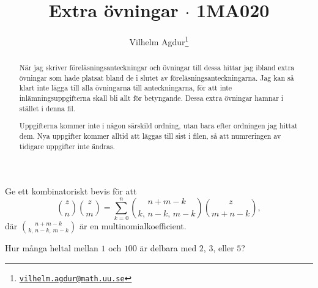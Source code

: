\documentclass[nobib]{tufte-handout}
\title{Extra övningar $\cdot$ 1MA020}
\author[Vilhelm Agdur]{Vilhelm Agdur\thanks{\href{mailto:vilhelm.agdur@math.uu.se}{\nolinkurl{vilhelm.agdur@math.uu.se}}}}
\begin{document}

\maketitle%

\begin{abstract}
\noindent
När jag skriver föreläsningsanteckningar och övningar till dessa hittar jag ibland extra övningar som hade platsat bland de i slutet av föreläsningsanteckningarna. Jag kan så klart inte lägga till alla övningarna till anteckningarna, för att inte inlämningsuppgifterna skall bli allt för betyngande. Dessa extra övningar hamnar i stället i denna fil.

Uppgifterna kommer inte i någon särskild ordning, utan bara efter ordningen jag hittat dem. Nya uppgifter kommer alltid att läggas till sist i filen, så att numreringen av tidigare uppgifter inte ändras.
\end{abstract}

\begin{xca}
    Ge ett kombinatoriskt bevis för att
    $$\binom{z}{n}\binom{z}{m} = \sum_{k=0}^{n} \binom{n + m - k}{k,\,n-k,\,m-k}\binom{z}{m + n -k},$$
    där $\binom{n + m - k}{k,\,n-k,\,m-k}$ är en multinomialkoefficient.
\end{xca}

\begin{xca}
    Hur många heltal mellan $1$ och $100$ är delbara med $2$, $3$, eller $5$?
\end{xca}

%
%
\end{document}
